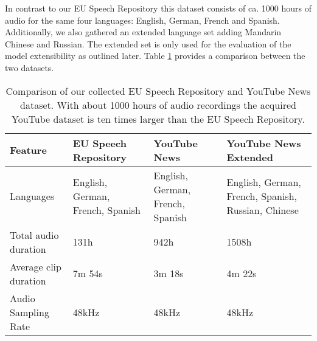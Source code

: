   	In contrast to our EU Speech Repository this dataset consists of ca. 1000 hours of audio  for the same four languages: English, German, French and Spanish. Additionally, we also gathered an extended language set adding Mandarin Chinese and Russian. The extended set is only used for the evaluation of the model extensibility as outlined later. Table \ref{tab:dataset_comparison} provides a comparison between the two datasets.
  	
  	
\begin{table}[]
\centering
\begin{tabularx}{\textwidth}{lXXX}
\toprule
Feature               & EU Speech Repository & YouTube News & YouTube News \mbox{Extended} \\ 
\midrule
Languages             & English, German, French, Spanish & English, German, French, Spanish & English, German, French, Spanish, Russian, Chinese \\
Total audio duration  & 131h   & 942h   & 1508h   \\
Average clip duration & 7m 54s & 3m 18s & 4m 22s  \\
Audio Sampling Rate   & 48kHz  & 48kHz  & 48kHz   \\ 
\bottomrule
\end{tabularx}
\caption{Comparison of our collected EU Speech Repository and YouTube News dataset. With about 1000 hours of audio recordings the acquired YouTube dataset is ten times larger than the EU Speech Repository.}
\label{tab:dataset_comparison}
\end{table}





